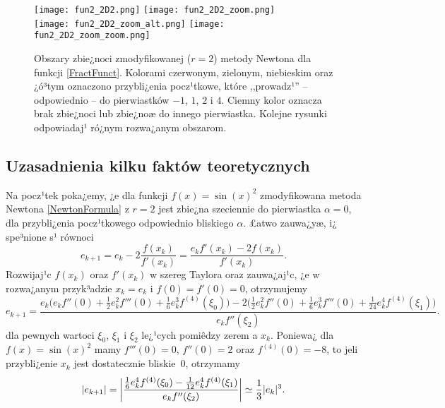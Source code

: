 \documentclass[a4paper,12pt]{article}
\begin{document}
\begin{figure}[h!]
\vspace*{-2ex}
\begin{center}
\texttt{[image: fun2\_2D2.png]}\hspace*{-4ex}
\texttt{[image: fun2\_2D2\_zoom.png]}\\[-1.5ex]
\texttt{[image: fun2\_2D2\_zoom\_alt.png]}\hspace*{-4ex}
\texttt{[image: fun2\_2D2\_zoom\_zoom.png]}\vspace*{-5ex}
\end{center}
\caption{\footnotesize Obszary zbie¿noci zmodyfikowanej ($r=2$) metody Newtona
dla funkcji \eqref{FractFunct}. Kolorami czerwonym, zielonym, niebieskim oraz ¿ó³tym
oznaczono przybli¿enia pocz¹tkowe, które ,,prowadz¹'' -- odpowiednio -- do pierwiastków
$-1$, $1$, $2$ i $4$. Ciemny kolor oznacza brak zbie¿noci lub zbie¿noæ do innego
pierwiastka. Kolejne rysunki odpowiadaj¹ ró¿nym rozwa¿anym obszarom.}
\label{R2}
\end{figure}

\subsection*{Uzasadnienia kilku faktów teoretycznych}

Na pocz¹tek poka¿emy, ¿e dla funkcji $f(x) = \sin(x)^2$ zmodyfikowana metoda Newtona
\eqref{NewtonFormula} z $r = 2$ jest zbie¿na szeciennie do pierwiastka $\alpha = 0$,
dla przybli¿enia pocz¹tkowego odpowiednio bliskiego $\alpha$. £atwo zauwa¿yæ,
i¿ spe³nione s¹ równoci
$$
  e_{k+1} = e_k - 2 \frac{f(x_k)}{f'(x_k)}
          = \frac{e_k f'(x_k) - 2 f(x_k)}{f'(x_k)}.
$$
Rozwijaj¹c $f(x_k)$ oraz $f'(x_k)$ w szereg Taylora oraz zauwa¿aj¹c, ¿e w rozwa¿anym
przyk³adzie $x_k = e_k$ i $f(0) = f'(0) = 0$, otrzymujemy
$$
  e_{k+1} = \frac{e_k \big(e_k f''(0) + \frac{1}{2} e_k^2 f'''(0)
                  + \frac{1}{6} e_k^3 f^{(4)}(\xi_0) \big)
                  - 2 \big( \frac{1}{2}e_k^2 f''(0) + \frac{1}{6} e_k^3 f'''(0)
                       + \frac{1}{24} e_k^4 f^{(4)}(\xi_1) \big)}
                 {e_k f''(\xi_2)}.
$$
dla pewnych wartoci $\xi_0$, $\xi_1$ i $\xi_2$ le¿¹cych
pomiêdzy zerem a $x_k$. Poniewa¿ dla $f(x) = \sin(x)^2$ mamy $f'''(0) = 0$,
$f''(0) = 2$ oraz $f^{(4)}(0) = -8$, to jeli przybli¿enie $x_k$ jest dostatecznie
bliskie~$0$, otrzymamy
$$
  |e_{k+1}| = \bigg|
              \frac{\frac{1}{6} e_k^4 f^{(4)}(\xi_0) - \frac{1}{12} e_k^4 f^{(4)}(\xi_1)}
                   {e_k f''(\xi_2)}
              \bigg|
            \simeq \frac{1}{3}|e_k|^3 .
\vspace{1ex}
$$
\end{document}
